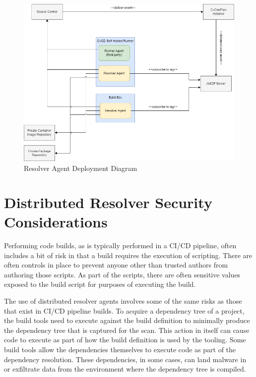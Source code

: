 \begin{figure}[ht]
  \includegraphics[width=\textwidth]{graphics/cxoneflow-diagrams-Resolver Agent Diagram.png}
  \caption{Resolver Agent Deployment Diagram}
  \label{fig:resolver-agent-diagram}
\end{figure}


\section{Distributed Resolver Security Considerations}\label{sec:dist-resolver-security-considerations}

Performing code builds, as is typically performed in a CI/CD pipeline, often includes
a bit of risk in that a build requires the execution of scripting.  There are often
controls in place to prevent anyone other than trusted authors from authoring those scripts.
As part of the scripts, there are often sensitive values exposed to the build script
for purposes of executing the build.

The use of distributed resolver agents involves some of the same risks as those that exist in
CI/CD pipeline builds.  To acquire a dependency tree of a project, the build tools
need to execute against the build definition to minimally produce the dependency
tree that is captured for the scan.  This action in itself can cause code to execute
as part of how the build definition is used by the tooling.  Some build tools allow
the dependencies themselves to execute code as part of the dependency resolution.
These dependencies, in some cases, can land malware in or exfiltrate data from the
environment where the dependency tree is compiled.

